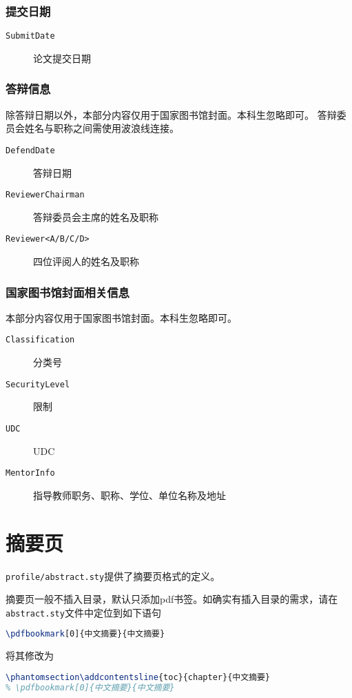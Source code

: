 \subsubsection{提交日期}
\begin{description}
    \item[\texttt{SubmitDate}] 论文提交日期
\end{description}

\subsubsection{答辩信息}

除答辩日期以外，本部分内容仅用于国家图书馆封面。本科生忽略即可。
答辩委员会姓名与职称之间需使用波浪线连接。

\begin{description}
    \item[\texttt{DefendDate}] 答辩日期
    \item[\texttt{ReviewerChairman}] 答辩委员会主席的姓名及职称 
    \item[\texttt{Reviewer<A/B/C/D>}] 四位评阅人的姓名及职称  
\end{description}

\subsubsection{国家图书馆封面相关信息}

本部分内容仅用于国家图书馆封面。本科生忽略即可。

\begin{description}
    \item[\texttt{Classification}] 分类号
    \item[\texttt{SecurityLevel}] 限制  
    \item[\texttt{UDC}] UDC
    \item[\texttt{MentorInfo}] 指导教师职务、职称、学位、单位名称及地址
\end{description}

\section{摘要页}

\texttt{profile/abstract.sty}提供了摘要页格式的定义。

摘要页一般不插入目录，默认只添加pdf书签。如确实有插入目录的需求，请在\texttt{abstract.sty}文件中定位到如下语句
\begin{lstlisting}[language=TeX]
% \phantomsection\addcontentsline{toc}{chapter}{中文摘要}
\pdfbookmark[0]{中文摘要}{中文摘要}
\end{lstlisting}
将其修改为
\begin{lstlisting}[language=TeX]
\phantomsection\addcontentsline{toc}{chapter}{中文摘要}
% \pdfbookmark[0]{中文摘要}{中文摘要}
\end{lstlisting}


